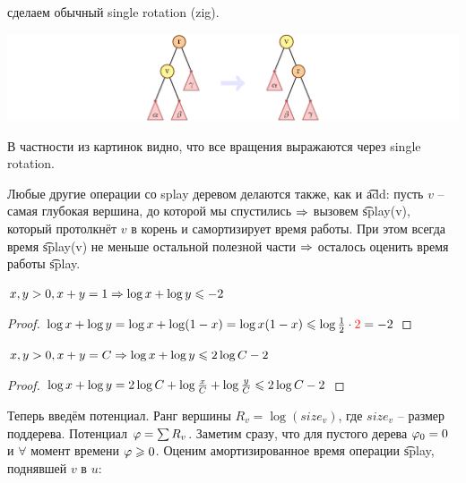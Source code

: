  сделаем обычный single rotation (zig).

\vspace*{-2em}
\begin{center}
\includegraphics{pics/single-rotate.png}
\end{center}

В частности из картинок видно, что все вращения выражаются через single rotation.

\pagebreak

Любые другие операции со splay деревом делаются также, как и \t{add}: пусть $v$ -- самая глубокая вершина, до которой мы спустились 
$\Rightarrow$ вызовем \t{splay(v)}, который протолкнёт $v$ в корень и самортизирует время работы.
При этом всегда время \t{splay(v)} не меньше остальной полезной части $\Rightarrow$
осталось оценить время работы \t{splay}.

\begin{Lm}$x, y > 0, x + y = 1 \Rightarrow \log x + \log y \leqslant -2$\end{Lm}
\begin{proof}$\log x + \log y = \log x + \log (1-x) = \log x(1-x) \leqslant \log{\textstyle\frac{1}{2}} \cdot{\color{red}{2}} = -2$\end{proof}
\begin{Lm}$x, y > 0, x + y = C \Rightarrow \log x + \log y \leqslant 2\log C - 2$\end{Lm}
\begin{proof}$\log x + \log y = 2\log C + \log{\textstyle\frac{x}{C}} + \log{\textstyle\frac{y}{C}} \leqslant 2\log C - 2$\end{proof}

Теперь введём потенциал. Ранг вершины $R_v = \log(size_v)$, где $size_v$ -- размер поддерева.
Потенциал $\varphi = \sum R_v$. Заметим сразу, что для пустого дерева $\varphi_0 = 0$ и $\forall$ момент времени $\varphi \geqslant 0$.
Оценим амортизированное время операции \t{splay}, поднявшей $v$ в $u$:

